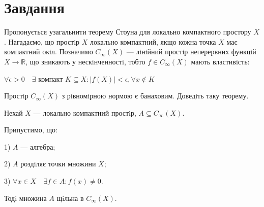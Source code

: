 
\chapter{Завдання \theHchapter}

\begin{tcolorbox}[title=Завдання]
    Пропонується узагальнити теорему Стоуна для 
    локально компактного простору $X$. 
    Нагадаємо, що простiр $X$ локально компактний, якщо кожна точка 
    $X$ має компактний окiл.
    Позначимо $C_{\infty}(X)$ — лiнiйний простiр неперервних функцiй 
    $X \rightarrow \mathbb{R}$, що зникають у нескiнченностi, 
    тобто $f \in C_{\infty}(X)$ мають властивiсть:
    
    
    $ \forall \epsilon > 0 \quad \exists$ компакт $K \subseteq X: |f(X)| < \epsilon, 
    \forall x \notin K $


    Простiр $C_{\infty}(X)$ з рiвномiрною нормою є банаховим.
    Доведiть таку теорему.
\end{tcolorbox}


\begin{tcolorbox}[title=Теорема Cтоуна для локально компактного простору.]
    Нехай $X$ — локально компактний простiр, $A \subseteq C_{\infty}(X)$. 
    
    
    Припустимо, що:


    1) $A$ — алгебра;

    
    2) $A$ роздiляє точки множини $X$;
    
    
    3) $\forall x \in X \quad \exists f \in A: f(x) \neq 0$.
    
    
    Тодi множина $A$ щiльна в $C_{\infty}(X)$.
\end{tcolorbox}


